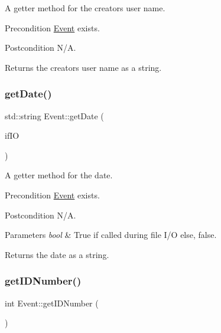 A getter method for the creator\textquotesingle{}s user name. \begin{DoxyPrecond}{Precondition}
\mbox{\hyperlink{class_event}{Event}} exists. 
\end{DoxyPrecond}
\begin{DoxyPostcond}{Postcondition}
N/A. 
\end{DoxyPostcond}
\begin{DoxyReturn}{Returns}
the creator\textquotesingle{}s user name as a string. 
\end{DoxyReturn}
\mbox{\label{class_event_a1b800fe1b0055d8bbd1711b7e1c9fabd}} 
\subsubsection{\texorpdfstring{get\+Date()}{getDate()}}
{\footnotesize\ttfamily std\+::string Event\+::get\+Date (\begin{DoxyParamCaption}\item[{bool}]{if\+IO }\end{DoxyParamCaption})}

A getter method for the date. \begin{DoxyPrecond}{Precondition}
\mbox{\hyperlink{class_event}{Event}} exists. 
\end{DoxyPrecond}
\begin{DoxyPostcond}{Postcondition}
N/A. 
\end{DoxyPostcond}

\begin{DoxyParams}{Parameters}
{\em bool} & True if called during file I/O else, false. \\
\hline
\end{DoxyParams}
\begin{DoxyReturn}{Returns}
the date as a string. 
\end{DoxyReturn}
\mbox{\label{class_event_a05365632b5779127ba605cced499bb31}} 
\subsubsection{\texorpdfstring{get\+I\+D\+Number()}{getIDNumber()}}
{\footnotesize\ttfamily int Event\+::get\+I\+D\+Number (\begin{DoxyParamCaption}{ }\end{DoxyParamCaption})}

